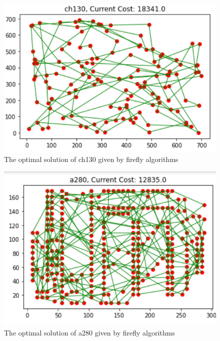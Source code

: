 \documentclass[twocolumn, a4paper]{extarticle}
\begin{document}
\begin{figure}[H]
	\centering
	\includegraphics[width=0.95\linewidth]{figure/fire_ch130}
	\caption{The optimal solution of ch130 given by firefly algorithms}
	\label{fig:firech130}
\end{figure}

\begin{figure}[H]
	\centering
	\includegraphics[width=0.95\linewidth]{figure/fire_a280}
	\caption{The optimal solution of a280 given by firefly algorithms}
	\label{fig:firea280}
\end{figure}
\end{document}
